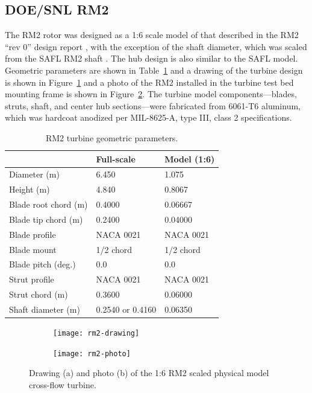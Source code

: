 \subsection{DOE/SNL RM2}

The RM2 rotor was designed as a 1:6 scale model of that described in the RM2
``rev 0'' design report \cite{Barone2011}, with the exception of the shaft
diameter, which was scaled from the SAFL RM2 shaft \cite{Hill2014}. The hub
design is also similar to the SAFL model. Geometric parameters are shown in
Table~\ref{tab:turb-geom} and a drawing of the turbine design is shown in
Figure~\ref{fig:rm2-drawing} and a photo of the RM2 installed in the turbine
test bed mounting frame is shown in Figure~\ref{fig:rm2-photo}. The turbine
model components---blades, struts, shaft, and center hub sections---were
fabricated from 6061-T6 aluminum, which was hardcoat anodized per MIL-8625-A,
type III, class 2 specifications.

\begin{table}[ht]
    \centering
    \begin{tabular}{l|l|l}
        & Full-scale & Model (1:6) \\
        \hline 
        Diameter (m)   & 6.450 & 1.075 \\ 
        Height (m)     & 4.840 & 0.8067 \\ 
        Blade root chord (m) & 0.4000 & 0.06667 \\ 
        Blade tip chord (m)  & 0.2400 & 0.04000 \\ 
        Blade profile & NACA 0021 & NACA 0021 \\ 
        Blade mount & 1/2 chord & 1/2 chord \\ 
        Blade pitch (deg.) & 0.0 & 0.0 \\ 
        Strut profile & NACA 0021 & NACA 0021 \\ 
        Strut chord (m) & 0.3600 & 0.06000 \\ 
        Shaft diameter (m) & 0.2540 \cite{Beam2011} or 0.4160 \cite{Hill2014} & 0.06350\\ 
    \end{tabular}
    \caption{RM2 turbine geometric parameters.}
    \label{tab:turb-geom}
\end{table}

\begin{figure}[ht]
    \centering
    
    \begin{subfigure}{0.53\textwidth}
        \texttt{[image: rm2-drawing]}
        \caption{}
        \label{fig:rm2-drawing}
    \end{subfigure}
    \begin{subfigure}{0.41\textwidth}
        \texttt{[image: rm2-photo]}
        \caption{}
        \label{fig:rm2-photo}
    \end{subfigure}
    
    \caption{Drawing (a) and photo (b) of the 1:6 RM2 scaled physical model cross-flow turbine.}
    \label{fig:rm2}
\end{figure}


